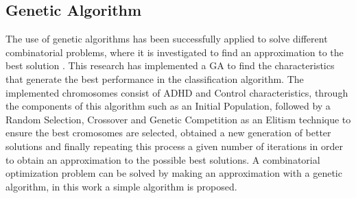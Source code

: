 \documentclass[letterpaper,12pt,openright,oneside]{article}
\begin{document}












\subsection{Genetic Algorithm}
The use of genetic algorithms has been successfully applied to solve different combinatorial problems, where it is investigated to find an approximation to the best solution \cite{QIN} \cite{abid}. This research has implemented a GA to find the characteristics that generate the best performance in the classification algorithm. The implemented chromosomes consist of ADHD and Control characteristics, through the components of this algorithm such as an Initial Population, followed by a Random Selection,  Crossover and Genetic Competition as an Elitism technique to ensure the best cromosomes are selected,  obtained a new generation of better solutions and finally repeating this process a given number of iterations in order to obtain an approximation to the possible best solutions.
A combinatorial optimization problem can be solved by making an approximation with a genetic algorithm, in this work a simple algorithm is proposed.\\
\end{document}
